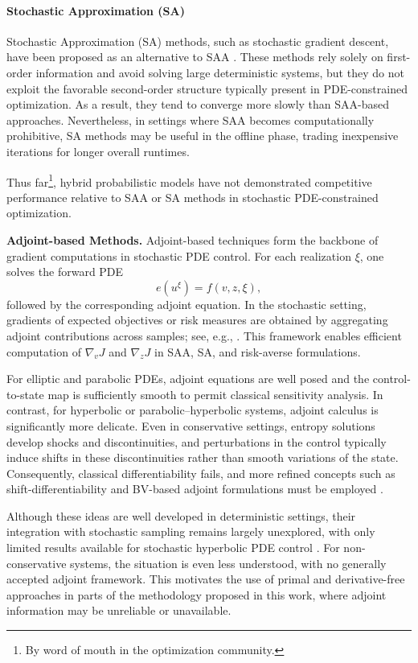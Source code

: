 \documentclass{article}
\newcommand{\1}{\mathds{1}}          %
\theoremstyle{definition}
\begin{document}
\begin{sloppypar}
\paragraph{Stochastic Approximation (SA)}
Stochastic Approximation (SA) methods, such as stochastic gradient descent, have been proposed as an alternative to SAA \cite{martin2021complexity}. These methods rely solely on first-order information and avoid solving large deterministic systems, but they do not exploit the favorable second-order structure typically present in PDE-constrained optimization. As a result, they tend to converge more slowly than SAA-based approaches. Nevertheless, in settings where SAA becomes computationally prohibitive, SA methods may be useful in the offline phase, trading inexpensive iterations for longer overall runtimes.

Thus far\footnote{By word of mouth in the optimization community.}, hybrid probabilistic models \cite{bandeira2014convergence} have not demonstrated competitive performance relative to SAA or SA methods in stochastic PDE-constrained optimization.

\textbf{Adjoint-based Methods.}
Adjoint-based techniques form the backbone of gradient computations in stochastic PDE control. For each realization $\xi$, one solves the forward PDE
\[
e(u^{\xi}) = f(v,z,\xi),
\]
followed by the corresponding adjoint equation. In the stochastic setting, gradients of expected objectives or risk measures are obtained by aggregating adjoint contributions across samples; see, e.g.,
\cite{Borzi2009,GarreisSuro2021,kouri2013trust,kouri2014inexact,
kouri2016risk,Milz2023,rosseel2012optimal}.  
This framework enables efficient computation of $\nabla_v J$ and $\nabla_z J$ in SAA, SA, and risk-averse formulations.

For elliptic and parabolic PDEs, adjoint equations are well posed and the control-to-state map is sufficiently smooth to permit classical sensitivity analysis. In contrast, for hyperbolic or parabolic--hyperbolic systems, adjoint calculus is significantly more delicate. Even in conservative settings, entropy solutions develop shocks and discontinuities, and perturbations in the control typically induce shifts in these discontinuities rather than smooth variations of the state. Consequently, classical differentiability fails, and more refined concepts such as shift-differentiability and BV-based adjoint formulations must be employed \cite{PfaffUlbrichTLP,Sulb2016,ulbrichpdeopthyper}.

Although these ideas are well developed in deterministic settings, their integration with stochastic sampling remains largely unexplored, with only limited results available for stochastic hyperbolic PDE control \cite{Esmaili2023}. For non-conservative systems, the situation is even less understood, with no generally accepted adjoint framework. This motivates the use of primal and derivative-free approaches in parts of the methodology proposed in this work, where adjoint information may be unreliable or unavailable.




\end{sloppypar}
\end{document}
